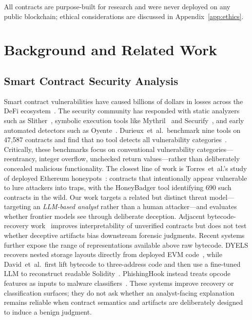 \documentclass[sigconf]{acmart}
\begin{document}
All contracts are purpose-built for research and were never deployed on
any public blockchain; ethical considerations are discussed in
Appendix~\ref{app:ethics}.

\section{Background and Related Work}\label{sec:related}

\subsection{Smart Contract Security Analysis}\label{sec:related:contracts}

Smart contract vulnerabilities have caused billions of dollars in losses
across the DeFi ecosystem~\cite{zhou2023sokdefi}. The security community
has responded with static analyzers such as
Slither~\cite{feist2019slither}, symbolic execution tools like
Mythril~\cite{mueller2018mythril} and
Securify~\cite{tsankov2018securify}, and early automated detectors such as
Oyente~\cite{luu2016oyente}. Durieux~et~al.\ benchmark nine tools on
47,587 contracts and find that no tool detects all vulnerability
categories~\cite{durieux2020empirical}. Critically, these benchmarks focus on
conventional vulnerability categories---reentrancy, integer overflow,
unchecked return values---rather than
deliberately concealed malicious functionality. The closest line of work
is Torres~et~al.'s study of deployed Ethereum
honeypots~\cite{torres2019honeypot}: contracts that intentionally appear
vulnerable to lure attackers into traps, with the HoneyBadger tool
identifying 690 such contracts in the wild. Our work targets a related
but distinct threat model---targeting an \emph{LLM-based analyst}
rather than a human attacker---and evaluates whether frontier models
see through deliberate deception. Adjacent
bytecode-recovery work~\cite{grech2019gigahorse,david2025decompiling}
improves interpretability of unverified contracts but does not test
whether deceptive artifacts bias downstream forensic judgments.
Recent systems further expose the range of representations available above
raw bytecode. DYELS recovers nested storage layouts directly from deployed
EVM code~\cite{lagouvardos2026dyels}, while David~et~al.\ first lift bytecode
to three-address code and then use a fine-tuned LLM to reconstruct readable
Solidity~\cite{david2025decompiling}. PhishingHook instead treats opcode
features as inputs to malware classifiers~\cite{derosa2025phishinghook}.
These systems improve recovery or classification surfaces; they do not ask
whether an analyst-facing explanation remains reliable when contract
semantics and artifacts are deliberately designed to induce a benign
judgment.
\end{document}
